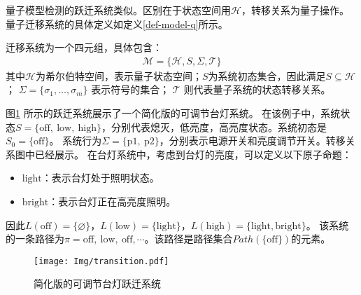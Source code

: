 量子模型检测的跃迁系统类似。区别在于状态空间用\(\mathcal{H}\)，转移关系为量子操作。量子迁移系统的具体定义如定义\ref{def-model-q}所示。
\begin{definition}\citep{2021}
    \label{def-model-q}
    迁移系统为一个四元组，具体包含：
    \begin{align}
        \mathcal{M}=\{\mathcal{H},S,\Sigma,\mathcal{T}\}
    \end{align}
    其中\(\mathcal{H}\)为希尔伯特空间，表示量子状态空间；\(S\)为系统初态集合，因此满足\(S\subseteq \mathcal{H}\)； $\Sigma=\{\sigma_1,\ldots,\sigma_m\}$ 表示符号的集合； $\mathcal{T}$ 则代表量子系统的状态转移关系。
\end{definition}
\begin{example}
    \label{ex-transition}
    图\ref{fig:transition-system} 所示的跃迁系统展示了一个简化版的可调节台灯系统。
    在该例子中，系统状态\(S=\{\text{off},\ \text{low},\ \text{high}\}\)，分别代表熄灭，低亮度，高亮度状态。系统初态是\(S_0 = \{\text{off}\}\)。
    系统行为\(\Sigma=\{\text{p1},\ \text{p2}\}\)，分别表示电源开关和亮度调节开关。转移关系图中已经展示。
    在台灯系统中，考虑到台灯的亮度，可以定义以下原子命题：
\begin{itemize}
    \item \(\text{light}\)：表示台灯处于照明状态。
    \item \(\text{bright}\)：表示台灯正在高亮度照明。
\end{itemize}
因此\(L\left(\text{off}  \right)=\{\varnothing\}\)，\(L\left(\text{low}\right)=\{\text{light}\}\)，\(L\left(\text{high}  \right)=\{\text{light},\text{bright}\}\)。
该系统的一条路径为\(\pi = \text{off},\ \text{low}, \ \text{off}, \cdots  \)。该路径是路径集合\(Path(\{\text{off}\})\)的元素。
    \begin{figure}[!htbp]
        \centering
        \texttt{[image: Img/transition.pdf]}
        \caption{简化版的可调节台灯跃迁系统}
        \label{fig:transition-system}
    \end{figure}
\end{example}

